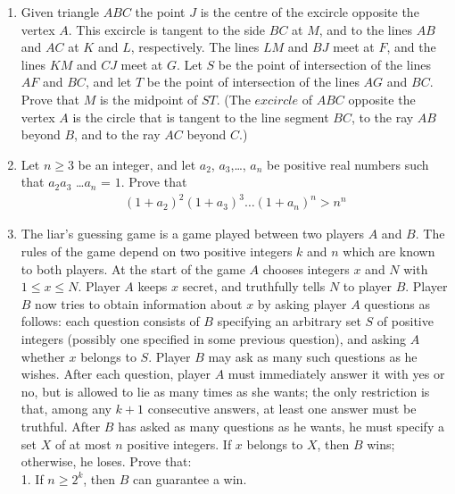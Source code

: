 \documentclass{article}
\begin{document}
\begin{enumerate}
\item Given triangle $ABC$ the point $J$ is the centre of the excircle opposite the vertex $A$. This excircle is tangent to the side $BC$ at $M$, and to the lines $AB$ and $AC$ at $K$ and $L$, respectively. The lines $LM$ and $BJ$ meet at $F$, and the lines $KM$ and $CJ$ meet at $G$. Let $S$ be the point of intersection of the lines $AF$ and $BC$, and let $T$ be the point of intersection of the lines $AG$ and $BC$. Prove that $M$ is the midpoint of $ST$.
(The $excircle$ of $ABC$ opposite the vertex $A$ is the circle that is tangent to the line segment $BC$, to the ray $AB$ beyond $B$, and to the ray $AC$ beyond $C$.)
\item  Let $n\geq{3}$ be an integer, and let $a_{2}$, $a_{3}$,\dots, $a_{n}$  be positive real numbers such that $a_{2}a_{3}$ \dots $a_{n}$ = $1$. Prove that
	\begin{align*}
	(1+a_{2}) ^{2}  (1+a_{3}) ^{3} \dots (1+a_{n}) ^{n} > n^{n}
	\end{align*}
\item The liar's guessing game is a game played between two players $A$ and $B$. The rules of the game depend on two positive integers $k$ and $n$ which are known to both players. At the start of the game $A$ chooses integers $x$ and $N$ with $1\leq{x}\leq{N}$. Player $A$ keeps $x$ secret, and truthfully tells $N$ to player $B$. Player $B$ now tries to obtain information about $x$ by asking player $A$ questions as follows: each question consists of $B$ specifying an arbitrary set $S$ of positive integers (possibly one specified in some previous question), and asking $A$ whether $x$ belongs to $S$. Player $B$ may ask as many such questions as he wishes. After each question, player $A$ must immediately answer it with yes or no, but is allowed to lie as many times as she wants; the only restriction is that, among any $k + 1$ consecutive answers, at least one answer must be truthful.
	After $B$ has asked as many questions as he wants, he must specify a set $X$ of at most $n$ positive integers. If $x$ belongs to $X$, then $B$ wins; otherwise, he loses. Prove that: \\
1. If $n\geq{2^{k}}$, then $B$ can guarantee a win.


\end{enumerate}
\end{document}
